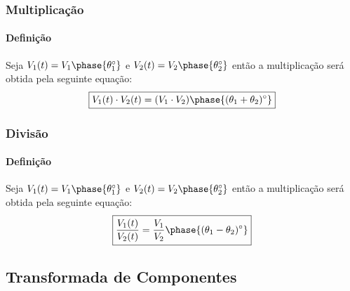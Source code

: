 \documentclass{article}
\begin{document}
        \begin{multicols}{2}
            \raggedcolumns
            \subsubsection{Multiplicação}
                \paragraph{Definição}Seja $V_{1}(t) = V_{1} \phase{\theta_{1}^{\circ}}$ e $V_{2}(t) = V_{2} \phase{\theta_{2}^{\circ}}$ então a multiplicação será obtida pela seguinte equação:
                    \begin{equation}
                        \boxed{
                            V_{1}(t) \cdot V_{2}(t) = 
                            (V_{1} \cdot V_{2})\phase{(\theta_{1} + \theta_{2})^{\circ}}
                        }
                    \end{equation}

            \columnbreak

            \subsubsection{Divisão}
                \paragraph{Definição}Seja $V_{1}(t) = V_{1} \phase{\theta_{1}^{\circ}}$ e $V_{2}(t) = V_{2} \phase{\theta_{2}^{\circ}}$ então a multiplicação será obtida pela seguinte equação:
                    \begin{equation}
                        \boxed{
                            \frac{V_{1}(t)}{V_{2}(t)} = 
                            \frac{V_{1}}{V_{2}} \phase{(\theta_{1} - \theta_{2})^{\circ}}
                        }
                    \end{equation}
        \end{multicols}

    \subsection{Transformada de Componentes}
\end{document}

